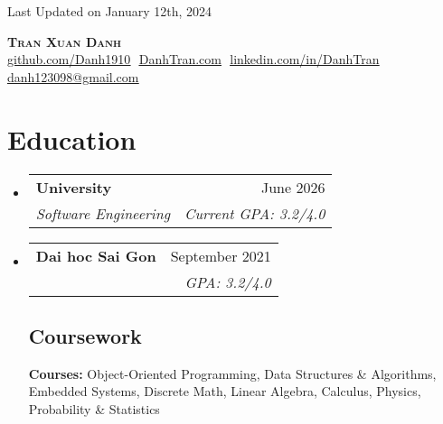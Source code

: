 \documentclass[letterpaper,11pt]{article}
\makeatletter
\newcommand{\resumeSubheading}[4]{
  \vspace{-2pt}\item
    \begin{tabular*}{0.97\textwidth}[t]{l@{\extracolsep{\fill}}r}
      \textbf{#1} & #2 \\
      \textit{\small#3} & \textit{\small #4} \\
    \end{tabular*}\vspace{-7pt}
}
\newcommand{\resumeSubHeadingListStart}{\begin{itemize}[leftmargin=0.15in, label={}]}
\newcommand{\resumeSubHeadingListEnd}{\end{itemize}}
\makeatother
\begin{document}
\begin{flushright}
  \color{gray}
  \item
  Last Updated on January 12th, 2024
\end{flushright}

\vspace{-5pt}

\begin{center}
    \textbf{\Huge \scshape Tran Xuan Danh} \\ \vspace{8pt}
    \small 
    \href{https://github.com/Danh1910}{\underline{github.com/Danh1910}} $  $
    \href{https://www.mattydoe.com}
    {\underline{DanhTran.com}} $  $
    \href{https://linkedin.com/in/mattydoe}{\underline{linkedin.com/in/DanhTran}} $  $
    \href{mailto:danh123098@gmail.com}
    {\underline{danh123098@gmail.com}}
\end{center}

\section{Education}
  \resumeSubHeadingListStart
  
    \resumeSubheading
      {University}{June 2026}
      {Software Engineering}{Current GPA: 3.2/4.0}
      
    \resumeSubheading
      {Dai hoc Sai Gon \footnotesize{}}{September 2021}
      {}{GPA: 3.2/4.0}

    \vspace{-10pt}

    \subsection{Coursework}
      \textbf{Courses:} Object-Oriented Programming, Data Structures \& Algorithms, Embedded Systems, Discrete Math, Linear Algebra, Calculus, Physics, Probability \& Statistics \\
      

  \resumeSubHeadingListEnd

\end{document}
